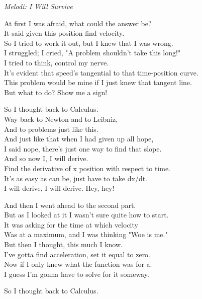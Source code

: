 {\footnotesize\textit{Melodi: I Will Survive}}\par
\vspace{10pt}
At first I was afraid, what could the answer be?\\
It said given this position find velocity.\\
So I tried to work it out, but I knew that I was wrong.\\
I struggled; I cried, "A problem shouldn't take this long!"\\
I tried to think, control my nerve.\\
It's evident that speed's tangential to that time-position curve.\\
This problem would be mine if I just knew that tangent line.\\
But what to do? Show me a sign!\par
\vspace{10pt}
So I thought back to Calculus.\\
Way back to Newton and to Leibniz,\\
And to problems just like this.\\
And just like that when I had given up all hope,\\
I said nope, there's just one way to find that slope.\\
And so now I, I will derive.\\
Find the derivative of x position with respect to time.\\
It's as easy as can be, just have to take dx/dt.\\
I will derive, I will derive. Hey, hey!\par
\vspace{10pt}
And then I went ahead to the second part.\\
But as I looked at it I wasn't sure quite how to start.\\
It was asking for the time at which velocity\\
Was at a maximum, and I was thinking "Woe is me."\\
But then I thought, this much I know.\\
I've gotta find acceleration, set it equal to zero.\\
Now if I only knew what the function was for a.\\
I guess I'm gonna have to solve for it someway.\par
\vspace{10pt}
So I thought back to Calculus.\\

